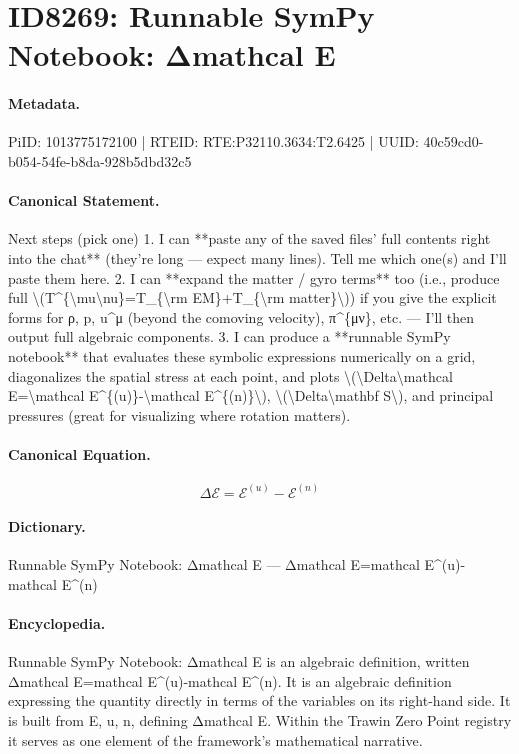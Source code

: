 \section*{ID8269: Runnable SymPy Notebook: Δmathcal E}
\paragraph{Metadata.}
PiID: 1013775172100 | RTEID: RTE:P32110.3634:T2.6425 | UUID: 40c59cd0-b054-54fe-b8da-928b5dbd32c5

\paragraph{Canonical Statement.}
Next steps (pick one) 1. I can **paste any of the saved files’ full contents right into the chat** (they’re long — expect many lines). Tell me which one(s) and I’ll paste them here. 2. I can **expand the matter / gyro terms** too (i.e., produce full \textbackslash{}(T\textasciicircum{}\{\textbackslash{}mu\textbackslash{}nu\}=T\_\{\textbackslash{}rm EM\}+T\_\{\textbackslash{}rm matter\}\textbackslash{})) if you give the explicit forms for ρ, p, u\textasciicircum{}μ (beyond the comoving velocity), π\textasciicircum{}\{μν\}, etc. — I’ll then output full algebraic components. 3. I can produce a **runnable SymPy notebook** that evaluates these symbolic expressions numerically on a grid, diagonalizes the spatial stress at each point, and plots \textbackslash{}(\textbackslash{}Delta\textbackslash{}mathcal E=\textbackslash{}mathcal E\textasciicircum{}\{(u)\}-\textbackslash{}mathcal E\textasciicircum{}\{(n)\}\textbackslash{}), \textbackslash{}(\textbackslash{}Delta\textbackslash{}mathbf S\textbackslash{}), and principal pressures (great for visualizing where rotation matters).

\paragraph{Canonical Equation.}
\[
\Delta\mathcal E=\mathcal E^{(u)}-\mathcal E^{(n)}
\]

\paragraph{Dictionary.}
Runnable SymPy Notebook: Δmathcal E — Δmathcal E=mathcal E\textasciicircum{}(u)-mathcal E\textasciicircum{}(n)

\paragraph{Encyclopedia.}
Runnable SymPy Notebook: Δmathcal E is an algebraic definition, written Δmathcal E=mathcal E\textasciicircum{}(u)-mathcal E\textasciicircum{}(n). It is an algebraic definition expressing the quantity directly in terms of the variables on its right-hand side. It is built from E, u, n, defining Δmathcal E. Within the Trawin Zero Point registry it serves as one element of the framework's mathematical narrative.
